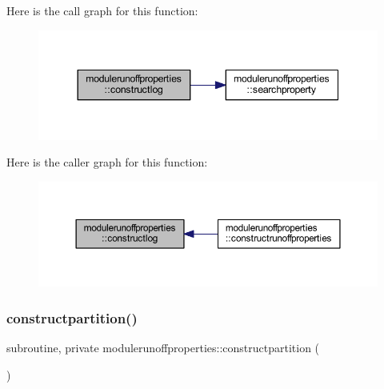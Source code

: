 Here is the call graph for this function\+:\nopagebreak
\begin{figure}[H]
\begin{center}
\leavevmode
\includegraphics[width=344pt]{namespacemodulerunoffproperties_a5ed964a29d4214b1f4cb89bf338fc96b_cgraph}
\end{center}
\end{figure}
Here is the caller graph for this function\+:\nopagebreak
\begin{figure}[H]
\begin{center}
\leavevmode
\includegraphics[width=350pt]{namespacemodulerunoffproperties_a5ed964a29d4214b1f4cb89bf338fc96b_icgraph}
\end{center}
\end{figure}
\mbox{\label{namespacemodulerunoffproperties_ac7e05edd5458dddb9680976873653eec}} 
\subsubsection{\texorpdfstring{constructpartition()}{constructpartition()}}
{\footnotesize\ttfamily subroutine, private modulerunoffproperties\+::constructpartition (\begin{DoxyParamCaption}{ }\end{DoxyParamCaption})\hspace{0.3cm}{\ttfamily [private]}}

